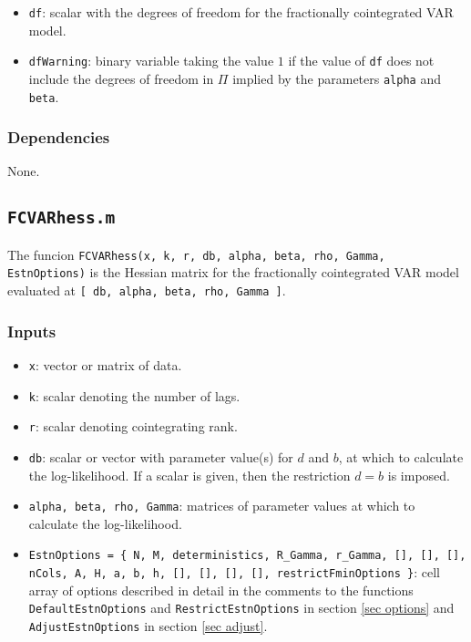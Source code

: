\documentclass[12pt]{article}
\begin{document}
\begin{itemize}

\item \texttt{df}: scalar with the degrees of freedom for the fractionally cointegrated VAR model. 

\item \texttt{dfWarning}: binary variable taking the value $1$ if the value of \texttt{df} does not include the degrees of freedom in $\Pi$ implied by the parameters \texttt{alpha} and \texttt{beta}. 

\end{itemize}

\subsubsection*{Dependencies}

None.






\newpage


\subsection{\texttt{FCVARhess.m}}

The funcion \texttt{FCVARhess(x, k, r, db, alpha, beta, rho, Gamma, EstnOptions)} is the Hessian matrix for the fractionally cointegrated VAR model evaluated at \texttt{[ db, alpha, beta, rho, Gamma ]}. 


\subsubsection*{Inputs}

\begin{itemize}
\item \texttt{x}: vector or matrix of data.

\item \texttt{k}: scalar denoting the number of lags.

\item \texttt{r}: scalar denoting cointegrating rank.

\item \texttt{db}: scalar or vector with parameter value(s) for $d$ and $b$, at which to calculate the log-likelihood. If a scalar is given, then the restriction $d=b$ is imposed.

\item \texttt{alpha, beta, rho, Gamma}: matrices of parameter values at which to calculate the log-likelihood.

\item \texttt{EstnOptions = \{ N, M, deterministics, R\_Gamma, r\_Gamma, [], [], [], nCols, A, H, a, b, h, [], [], [], [], restrictFminOptions \}}: cell array of options described in detail in the comments to the functions \texttt{DefaultEstnOptions} and \texttt{RestrictEstnOptions} in section \ref{sec options} and \texttt{AdjustEstnOptions} in section \ref{sec adjust}. 

\end{itemize}
\end{document}
